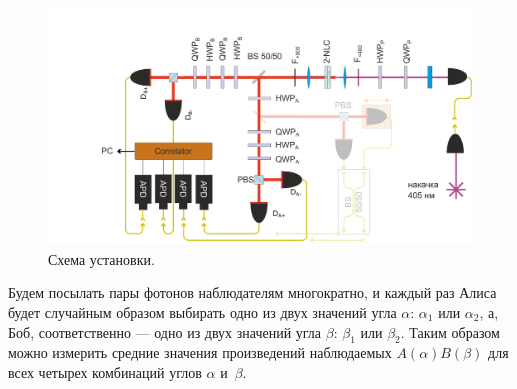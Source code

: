 \documentclass[12pt,a5paper]{article}
\numberwithin{equation}{section}
\begin{document}
\begin{figure}[]
  \begin{center}
  \includegraphics[width=\linewidth]{Setup_Bell_6.pdf}
  \caption{Схема установки. }\label{fig:Bell}
  \end{center}
  \end{figure}


Будем посылать пары фотонов наблюдателям многократно, и каждый раз Алиса будет случайным образом выбирать одно из двух значений угла $\alpha$: $\alpha_1$ или $\alpha_2$, а, Боб, соответственно --- одно из двух значений угла $\beta$: $\beta_1$ или $\beta_2$.
Таким образом можно измерить средние значения произведений наблюдаемых $A(\alpha)B(\beta)$ для всех четырех комбинаций углов $\alpha$ и~$\beta$.
\end{document}
